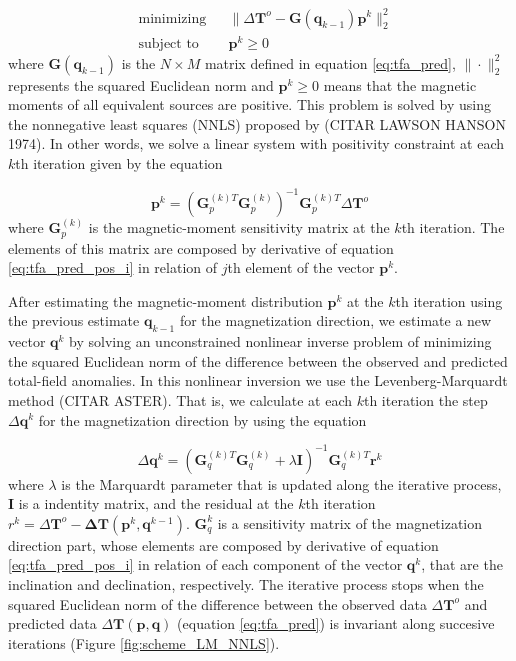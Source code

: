 \begin{equation}
	\begin{aligned}
		& \text{minimizing}
		& &\lVert \Delta \mathbf{T}^o - \mathbf{G}(\mathbf{q}_{k-1}) \mathbf{p}^k \rVert_{2}^{2} \\
		& \text{subject to}
		& & \mathbf{p}^k \geqslant 0
	\end{aligned}
	\label{eq:positivity}
\end{equation}
where $\mathbf{G}(\mathbf{q}_{k-1})$ is the $N \times M$ matrix defined in equation \ref{eq:tfa_pred},
$\| \cdot \|_{2}^{2}$ represents the squared Euclidean norm and $\mathbf{p}^k \geqslant 0$ means that the magnetic moments of all equivalent sources are positive. This problem is solved by using the nonnegative least squares (NNLS) proposed by (CITAR LAWSON HANSON 1974). In other words, we solve a linear system with positivity constraint at each $k$th iteration given by the equation 

\begin{equation}
	\mathbf{p}^k = \left(\mathbf{G}_{p}^{(k)T} \mathbf{G}_{p}^{(k)}\right)^{-1} \mathbf{G}_{p}^{(k)T}  \Delta \mathbf{T}^o
	\label{eq:linsys_p}
\end{equation}
where $\mathbf{G}_p^{(k)}$ is the magnetic-moment sensitivity matrix at the $k$th iteration. The elements of this matrix are composed by derivative of equation \ref{eq:tfa_pred_pos_i} in relation of $j$th element of the vector $\mathbf{p}^k$.

After estimating the magnetic-moment distribution $\mathbf{p}^k$ at the $k$th iteration using the previous estimate $\mathbf{q}_{k-1}$ for the magnetization direction, we estimate a new vector $\mathbf{q}^{k}$ by solving an unconstrained nonlinear inverse problem of minimizing the squared Euclidean norm of the difference between the observed and predicted total-field anomalies. In this nonlinear inversion we use the Levenberg-Marquardt method (CITAR ASTER). That is, we calculate at each $k$th iteration the step $\Delta \mathbf{q}^k$ for the magnetization direction by using the equation

\begin{equation}
	\Delta \mathbf{q}^k = (\mathbf{G}_{q}^{(k)T} \mathbf{G}_{q}^{(k)} + \lambda \mathbf{I})^{-1} \mathbf{G}_{q}^{(k)T}  \mathbf{r}^k
	\label{eq:linsys_q}
\end{equation}
where $\lambda$ is the Marquardt parameter that is updated along the iterative process, $\mathbf{I}$ is a indentity matrix, and  the residual at the $k$th iteration $r^k = \Delta \mathbf{T}^o - \mathbf{\Delta T} (\mathbf{p}^k, \mathbf{q}^{k-1})$. $\mathbf{G}_q^k$ is a sensitivity matrix of the magnetization direction part, whose elements are composed by derivative of equation \ref{eq:tfa_pred_pos_i} in relation of each component of the vector $\mathbf{q}^k$, that are the inclination and declination, respectively. The iterative process stops when the squared Euclidean norm of the difference between the observed data $\Delta \mathbf{T}^{o}$ and predicted data $\Delta\mathbf{T}(\mathbf{p}, \mathbf{q})$ (equation \ref{eq:tfa_pred}) is invariant along succesive iterations (Figure \ref{fig:scheme_LM_NNLS}).


